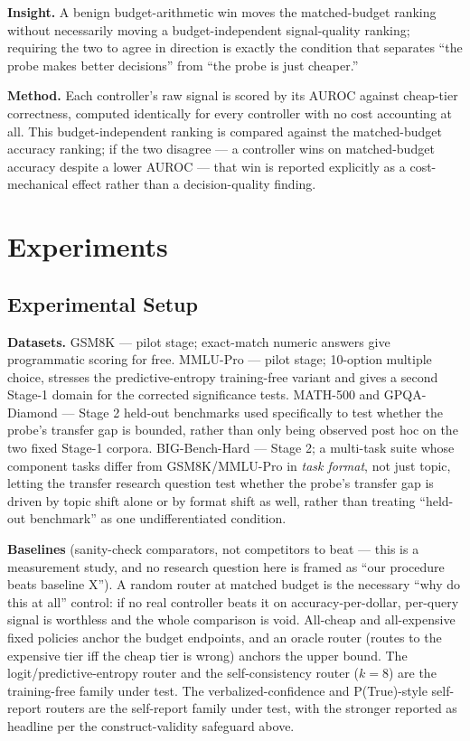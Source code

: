 \documentclass[11pt]{article}
\begin{document}
\textbf{Insight.} A benign budget-arithmetic win moves the matched-budget ranking without necessarily moving a budget-independent signal-quality ranking; requiring the two to agree in direction is exactly the condition that separates ``the probe makes better decisions'' from ``the probe is just cheaper.''

\textbf{Method.} Each controller's raw signal is scored by its AUROC against cheap-tier correctness, computed identically for every controller with no cost accounting at all. This budget-independent ranking is compared against the matched-budget accuracy ranking; if the two disagree --- a controller wins on matched-budget accuracy despite a lower AUROC --- that win is reported explicitly as a cost-mechanical effect rather than a decision-quality finding.

\section{Experiments}

\subsection{Experimental Setup}

\textbf{Datasets.} GSM8K --- pilot stage; exact-match numeric answers give programmatic scoring for free. MMLU-Pro --- pilot stage; 10-option multiple choice, stresses the predictive-entropy training-free variant and gives a second Stage-1 domain for the corrected significance tests. MATH-500 and GPQA-Diamond --- Stage 2 held-out benchmarks used specifically to test whether the probe's transfer gap is bounded, rather than only being observed post hoc on the two fixed Stage-1 corpora. BIG-Bench-Hard --- Stage 2; a multi-task suite whose component tasks differ from GSM8K/MMLU-Pro in \emph{task format}, not just topic, letting the transfer research question test whether the probe's transfer gap is driven by topic shift alone or by format shift as well, rather than treating ``held-out benchmark'' as one undifferentiated condition.

\textbf{Baselines} (sanity-check comparators, not competitors to beat --- this is a measurement study, and no research question here is framed as ``our procedure beats baseline X''). A random router at matched budget is the necessary ``why do this at all'' control: if no real controller beats it on accuracy-per-dollar, per-query signal is worthless and the whole comparison is void. All-cheap and all-expensive fixed policies anchor the budget endpoints, and an oracle router (routes to the expensive tier iff the cheap tier is wrong) anchors the upper bound. The logit/predictive-entropy router and the self-consistency router ($k=8$) are the training-free family under test. The verbalized-confidence and P(True)-style self-report routers are the self-report family under test, with the stronger reported as headline per the construct-validity safeguard above.
\end{document}

